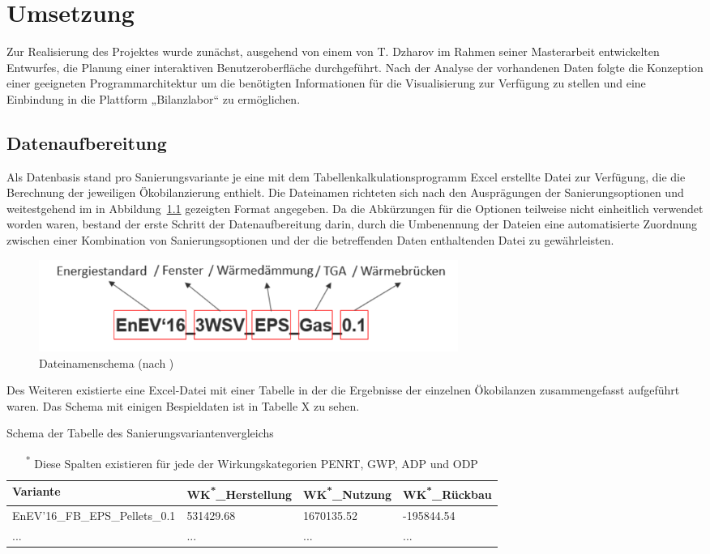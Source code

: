 \chapter{Umsetzung}
Zur Realisierung des Projektes wurde zunächst, ausgehend von einem von T. Dzharov im Rahmen seiner Masterarbeit entwickelten Entwurfes, die Planung einer interaktiven Benutzeroberfläche durchgeführt. Nach der Analyse der vorhandenen Daten folgte die Konzeption einer geeigneten Programmarchitektur um die benötigten Informationen für die Visualisierung zur Verfügung zu stellen und eine Einbindung in die Plattform „Bilanzlabor“ zu ermöglichen.
\section{Datenaufbereitung}
Als Datenbasis stand pro Sanierungsvariante je eine mit dem Tabellenkalkulationsprogramm Excel erstellte Datei zur Verfügung, die die Berechnung der jeweiligen Ökobilanzierung enthielt. Die Dateinamen richteten sich nach den Ausprägungen der Sanierungsoptionen und weitestgehend im in Abbildung~\ref{fig:dateinamenschema} gezeigten Format angegeben. Da die Abkürzungen für die Optionen teilweise nicht einheitlich verwendet worden waren, bestand der erste Schritt der Datenaufbereitung darin, durch die Umbenennung der Dateien eine automatisierte Zuordnung zwischen einer Kombination von Sanierungsoptionen und der die betreffenden Daten enthaltenden Datei zu gewährleisten.
\begin{figure}[htbp]
	\centering
	\includegraphics[height=30mm]{figures/dateiname.png}
	\caption[Dateinamenschema]{Dateinamenschema (nach \autocite{milgram})}
	\label{fig:dateinamenschema}	
\end{figure}   
Des Weiteren existierte eine Excel-Datei mit einer Tabelle in der die Ergebnisse der einzelnen Ökobilanzen zusammengefasst aufgeführt waren. Das Schema mit einigen Bespieldaten ist in Tabelle X zu sehen.
\begin{table}[htpb]
	\caption[Example table]{Schema der Tabelle des Sanierungsvariantenvergleichs }\label{tab:wirkungsindikatoren}
	\centering
	\begin{tabular}{l l l l}
		\toprule
		Variante & WK\textsuperscript{*}\_Herstellung & WK\textsuperscript{*}\_Nutzung & WK\textsuperscript{*}\_Rückbau \\
		\midrule
		EnEV'16\_FB\_EPS\_Pellets\_0.1 & 531429.68 & 1670135.52 & -195844.54 \\ \hline
		... & ... & ... & ... \\ \hline
		\bottomrule
	\end{tabular}
\caption*{\textsuperscript{*} Diese Spalten existieren für jede der Wirkungskategorien PENRT, GWP, ADP und ODP}
\end{table} 

